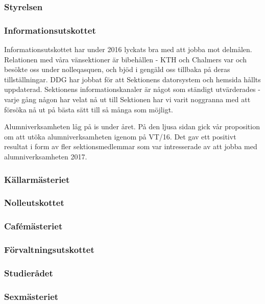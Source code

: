 \documentclass[../_main/handlingar.tex]{subfiles}
\begin{document}

\subsubsection*{Styrelsen}

\subsubsection*{Informationsutskottet}
Informationsutskottet har under 2016 lyckats bra med att jobba mot delmålen. Relationen med våra vänsektioner är bibehållen - KTH och Chalmers var och besökte oss under nolleqasquen, och bjöd i gengäld oss tillbaka på deras tillställningar. DDG har jobbat för att Sektionens datorsystem och hemsida hållts uppdaterad. Sektionens informationskanaler är något som ständigt utvärderades - varje gång någon har velat nå ut till Sektionen har vi varit noggranna med att försöka nå ut på bästa sätt till så många som möjligt.

Alumniverksamheten låg på is under året. På den ljusa sidan gick vår proposition om att utöka alumniverksamheten igenom på VT/16. Det gav ett positivt resultat i form av fler sektionsmedlemmar som var intresserade av att jobba med alumniverksamheten 2017.


\subsubsection*{Källarmästeriet}

\subsubsection*{Nolleutskottet}

\subsubsection*{Cafémästeriet}

\subsubsection*{Förvaltningsutskottet}

\subsubsection*{Studierådet}

\subsubsection*{Sexmästeriet}
\end{document}

